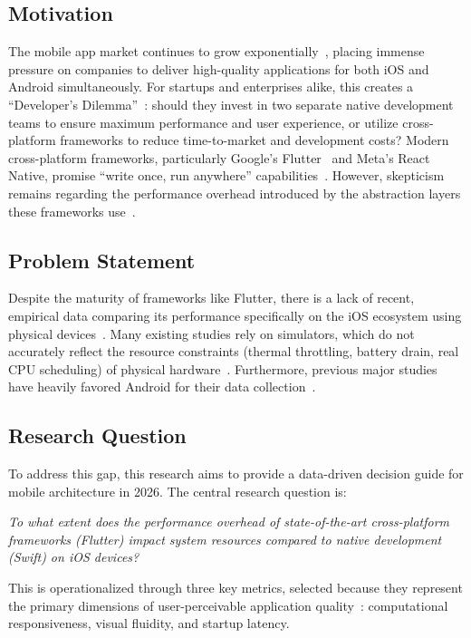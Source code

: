 \documentclass[journal]{IEEEtran}
\begin{document}
\subsection{Motivation}
The mobile app market continues to grow exponentially~\cite{statista2024}, placing immense pressure on companies to deliver
high-quality applications for both iOS and Android simultaneously. For startups and enterprises alike,
this creates a ``Developer's Dilemma''~\cite{majchrzak2017}: should they invest in two separate native
development teams to ensure maximum performance and user experience, or utilize cross-platform frameworks
to reduce time-to-market and development costs? Modern cross-platform frameworks, particularly
Google's Flutter~\cite{flutter2024} and Meta's React Native, promise ``write once, run anywhere''
capabilities~\cite{bjornhansen2020}. However, skepticism remains regarding the performance overhead introduced by the abstraction
layers these frameworks use~\cite{you2021}.

\subsection{Problem Statement}
Despite the maturity of frameworks like Flutter, there is a lack of recent, empirical data comparing its
performance specifically on the iOS ecosystem using physical devices~\cite{you2021}. Many existing studies rely on
simulators, which do not accurately reflect the resource constraints (thermal throttling, battery drain,
real CPU scheduling) of physical hardware~\cite{horn2023}. Furthermore, previous major studies have heavily favored
Android for their data collection~\cite{you2021, horn2023}.

\subsection{Research Question}
To address this gap, this research aims to provide a data-driven decision guide for mobile architecture
in 2026. The central research question is:

\textit{To what extent does the performance overhead of state-of-the-art cross-platform frameworks (Flutter)
impact system resources compared to native development (Swift) on iOS devices?}

This is operationalized through three key metrics, selected because they represent the primary dimensions of user-perceivable application quality~\cite{bjornhansen2020}: computational responsiveness, visual fluidity, and startup latency.
\end{document}
